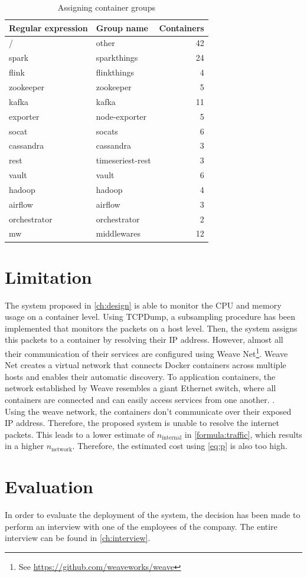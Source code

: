 \begin{table}
    \centering
    \begin{tabular}{l|lr}
        Regular expression & Group name & Containers \\ \hline
        / & other & 42 \\
        spark & sparkthings & 24\\
        flink & flinkthings & 4\\
        zookeeper & zookeeper & 5\\
        kafka & kafka & 11\\
        exporter & node-exporter & 5\\
        socat & socats & 6\\
        cassandra & cassandra & 3\\
        rest & timeseriest-rest & 3\\
        vault & vault & 6\\
        hadoop & hadoop & 4\\
        airflow & airflow & 3\\
        orchestrator & orchestrator & 2\\
        mw & middlewares & 12\\
    \end{tabular}
    \caption{Assigning container groups}
    \label{tab:regex}
\end{table}


\section{Limitation}
The system proposed in \autoref{ch:design} is able to monitor the CPU and memory usage on a container level. Using TCPDump, a subsampling procedure has been implemented that monitors the packets on a host level. Then, the system assigns this packets to a container by resolving their IP address. However, almost all their communication of their services are configured using Weave Net\footnote{See \url{https://github.com/weaveworks/weave}}. Weave Net creates a virtual network that connects Docker containers across multiple hosts and enables their automatic discovery. To application containers, the network established by Weave resembles a giant Ethernet switch, where all containers are connected and can easily access services from one another. \cite{weave}.\\

\noindent
Using the weave network, the containers don't communicate over their exposed IP address. Therefore, the proposed system is unable to resolve the internet packets. This leads to a lower estimate of $n_\text{internal}$ in \autoref{formula:traffic}, which results in a higher $n_\text{network}$. Therefore, the estimated cost using \autoref{eq:p} is also too high.


\section{Evaluation} \label{sec:sb-evaluation}
In order to evaluate the deployment of the system, the decision has been made to perform an interview with one of the employees of the company. The entire interview can be found in \autoref{ch:interview}.